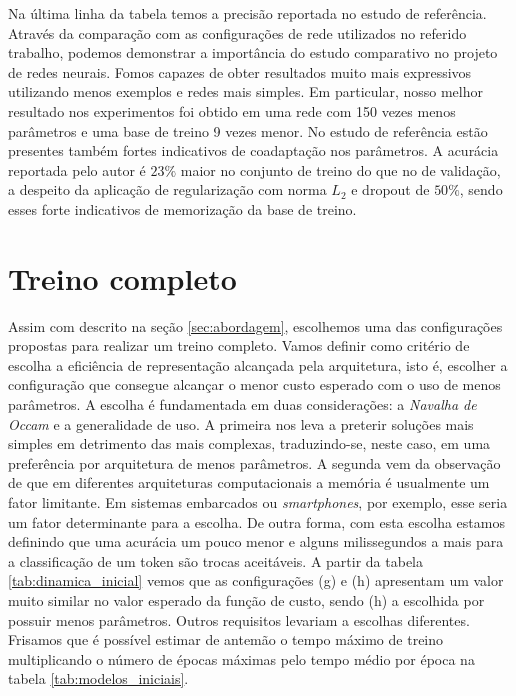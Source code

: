 Na última linha da tabela temos a precisão reportada no estudo de referência. Através da comparação com as configurações de rede utilizados no referido trabalho, podemos demonstrar a importância do estudo comparativo no projeto de redes neurais. Fomos capazes de obter resultados muito mais expressivos utilizando menos exemplos e redes mais simples. Em particular, nosso melhor resultado nos experimentos foi obtido em uma rede com 150 vezes menos parâmetros e uma base de treino 9 vezes menor. No estudo de referência estão presentes também fortes indicativos de coadaptação nos parâmetros. A acurácia reportada pelo autor é $23\%$ maior no conjunto de treino do que no de  validação, a despeito da aplicação de regularização com norma $L_2$ e dropout de $50\%$, sendo esses forte indicativos de memorização da base de treino.

\section{Treino completo} \label{sec:completo}

Assim com descrito na seção \ref{sec:abordagem}, escolhemos uma das configurações propostas para realizar um treino completo. Vamos definir como critério de escolha a eficiência de representação alcançada pela arquitetura, isto é, escolher a configuração que consegue alcançar o menor custo esperado com o uso de menos parâmetros. A escolha é fundamentada em duas considerações: a \textit{Navalha de Occam} e a generalidade de uso. A primeira nos leva a preterir soluções mais simples em detrimento das mais complexas, traduzindo-se, neste caso, em uma preferência por arquitetura de menos parâmetros. A segunda vem da observação de que em diferentes arquiteturas computacionais a memória é usualmente um fator limitante. Em sistemas embarcados ou \textit{smartphones}, por exemplo, esse seria um fator determinante para a escolha. De outra forma, com esta escolha estamos definindo que uma acurácia um pouco menor e alguns milissegundos a mais para a classificação de um token são trocas aceitáveis. A partir da tabela \ref{tab:dinamica_inicial} vemos que as configurações (g) e (h) apresentam um valor muito similar no valor esperado da função de custo, sendo (h) a escolhida por possuir menos parâmetros.  Outros requisitos levariam a escolhas diferentes. Frisamos que é possível estimar de antemão o tempo máximo de treino multiplicando o número de épocas máximas pelo tempo médio por época na tabela \ref{tab:modelos_iniciais}.

